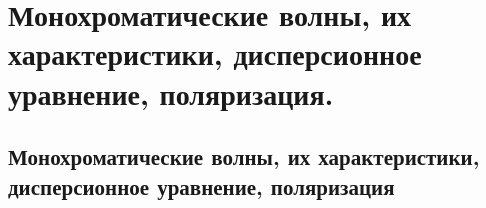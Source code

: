 \chapter{Монохроматические волны, их характеристики, дисперсионное 
уравнение, поляризация.}

\section{Монохроматические волны, их характеристики, дисперсионное 
уравнение, поляризация}
